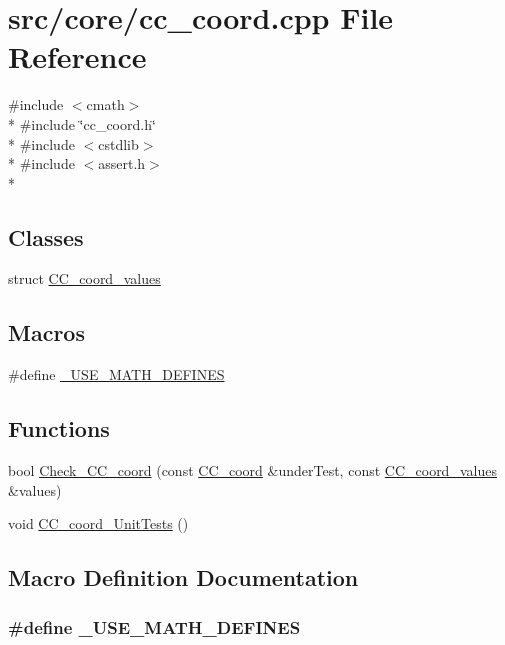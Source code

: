 \hypertarget{a00203}{\section{src/core/cc\-\_\-coord.cpp File Reference}
\label{a00203}
}
{\ttfamily \#include $<$cmath$>$}\\*
{\ttfamily \#include \char`\"{}cc\-\_\-coord.\-h\char`\"{}}\\*
{\ttfamily \#include $<$cstdlib$>$}\\*
{\ttfamily \#include $<$assert.\-h$>$}\\*
\subsection*{Classes}
\begin{DoxyCompactItemize}
\item 
struct \hyperlink{a00030}{C\-C\-\_\-coord\-\_\-values}
\end{DoxyCompactItemize}
\subsection*{Macros}
\begin{DoxyCompactItemize}
\item 
\#define \hyperlink{a00203_a525335710b53cb064ca56b936120431e}{\-\_\-\-U\-S\-E\-\_\-\-M\-A\-T\-H\-\_\-\-D\-E\-F\-I\-N\-E\-S}
\end{DoxyCompactItemize}
\subsection*{Functions}
\begin{DoxyCompactItemize}
\item 
bool \hyperlink{a00203_a3e398b243dea2ca148762802fa6b8cf1}{Check\-\_\-\-C\-C\-\_\-coord} (const \hyperlink{a00029}{C\-C\-\_\-coord} \&under\-Test, const \hyperlink{a00030}{C\-C\-\_\-coord\-\_\-values} \&values)
\item 
void \hyperlink{a00203_a6014cc2d64702c71dff02ed2f3feca4d}{C\-C\-\_\-coord\-\_\-\-Unit\-Tests} ()
\end{DoxyCompactItemize}


\subsection{Macro Definition Documentation}
\hypertarget{a00203_a525335710b53cb064ca56b936120431e}{
\subsubsection[{\-\_\-\-U\-S\-E\-\_\-\-M\-A\-T\-H\-\_\-\-D\-E\-F\-I\-N\-E\-S}]{\setlength{\rightskip}{0pt plus 5cm}\#define \-\_\-\-U\-S\-E\-\_\-\-M\-A\-T\-H\-\_\-\-D\-E\-F\-I\-N\-E\-S}}\label{a00203_a525335710b53cb064ca56b936120431e}


